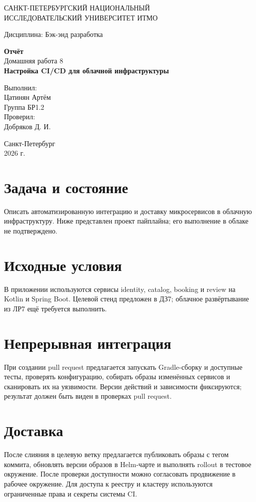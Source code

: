 \documentclass[14pt,a4paper]{extarticle}
\begin{document}
\begin{titlepage}\begin{center}
САНКТ-ПЕТЕРБУРГСКИЙ НАЦИОНАЛЬНЫЙ\\ ИССЛЕДОВАТЕЛЬСКИЙ УНИВЕРСИТЕТ ИТМО
\vspace{1.5cm}

Дисциплина: Бэк-энд разработка
\vspace{1.5cm}

\textbf{Отчёт}\\[0.5cm]
Домашняя работа 8\\[0.5cm]
\textbf{Настройка CI/CD для облачной инфраструктуры}
\vfill
\begin{flushright}Выполнил:\\ Цатинян Артём\\ Группа БР1.2\\[0.8cm] Проверил:\\ Добряков Д. И.\end{flushright}
\vfill Санкт-Петербург\\ 2026 г.\end{center}\end{titlepage}
\section{Задача и состояние}
Описать автоматизированную интеграцию и доставку микросервисов в облачную инфраструктуру. Ниже представлен проект пайплайна; его выполнение в облаке не подтверждено.
\section{Исходные условия}
В приложении используются сервисы identity, catalog, booking и review на Kotlin и Spring Boot. Целевой стенд предложен в ДЗ7; облачное развёртывание из ЛР7 ещё требуется выполнить.
\section{Непрерывная интеграция}
При создании pull request предлагается запускать Gradle-сборку и доступные тесты, проверять конфигурацию, собирать образы изменённых сервисов и сканировать их на уязвимости. Версии действий и зависимости фиксируются; результат должен быть виден в проверках pull request.
\section{Доставка}
После слияния в целевую ветку предлагается публиковать образы с тегом коммита, обновлять версии образов в Helm-чарте и выполнять rollout в тестовое окружение. После проверки доступности можно согласовать продвижение в рабочее окружение. Для доступа к реестру и кластеру используются ограниченные права и секреты системы CI.
\end{document}
